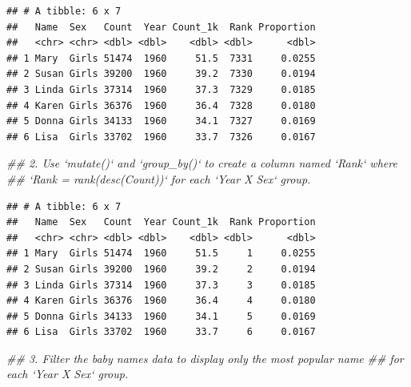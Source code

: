 \documentclass[]{book}
\newenvironment{Shaded}{\begin{snugshade}}{\end{snugshade}}
\newcommand{\CommentTok}[1]{\textcolor[rgb]{0.56,0.35,0.01}{\textit{#1}}}
\newcommand{\DataTypeTok}[1]{\textcolor[rgb]{0.13,0.29,0.53}{#1}}
\newcommand{\KeywordTok}[1]{\textcolor[rgb]{0.13,0.29,0.53}{\textbf{#1}}}
\newcommand{\NormalTok}[1]{#1}
\newcommand{\OperatorTok}[1]{\textcolor[rgb]{0.81,0.36,0.00}{\textbf{#1}}}
\newcommand{\StringTok}[1]{\textcolor[rgb]{0.31,0.60,0.02}{#1}}
\begin{document}
\begin{verbatim}
## # A tibble: 6 x 7
##   Name  Sex   Count  Year Count_1k  Rank Proportion
##   <chr> <chr> <dbl> <dbl>    <dbl> <dbl>      <dbl>
## 1 Mary  Girls 51474  1960     51.5  7331     0.0255
## 2 Susan Girls 39200  1960     39.2  7330     0.0194
## 3 Linda Girls 37314  1960     37.3  7329     0.0185
## 4 Karen Girls 36376  1960     36.4  7328     0.0180
## 5 Donna Girls 34133  1960     34.1  7327     0.0169
## 6 Lisa  Girls 33702  1960     33.7  7326     0.0167
\end{verbatim}

\begin{Shaded}
\begin{Highlighting}[]
\CommentTok{## 2.  Use `mutate()` and `group_by()` to create a column named `Rank` where }
\CommentTok{##     `Rank = rank(desc(Count))` for each `Year X Sex` group.}
\end{Highlighting}
\end{Shaded}

\begin{Shaded}
\end{Shaded}

\begin{verbatim}
## # A tibble: 6 x 7
##   Name  Sex   Count  Year Count_1k  Rank Proportion
##   <chr> <chr> <dbl> <dbl>    <dbl> <dbl>      <dbl>
## 1 Mary  Girls 51474  1960     51.5     1     0.0255
## 2 Susan Girls 39200  1960     39.2     2     0.0194
## 3 Linda Girls 37314  1960     37.3     3     0.0185
## 4 Karen Girls 36376  1960     36.4     4     0.0180
## 5 Donna Girls 34133  1960     34.1     5     0.0169
## 6 Lisa  Girls 33702  1960     33.7     6     0.0167
\end{verbatim}

\begin{Shaded}
\begin{Highlighting}[]
\CommentTok{## 3.  Filter the baby names data to display only the most popular name }
\CommentTok{##     for each `Year X Sex` group.}
\end{Highlighting}
\end{Shaded}
\end{document}
